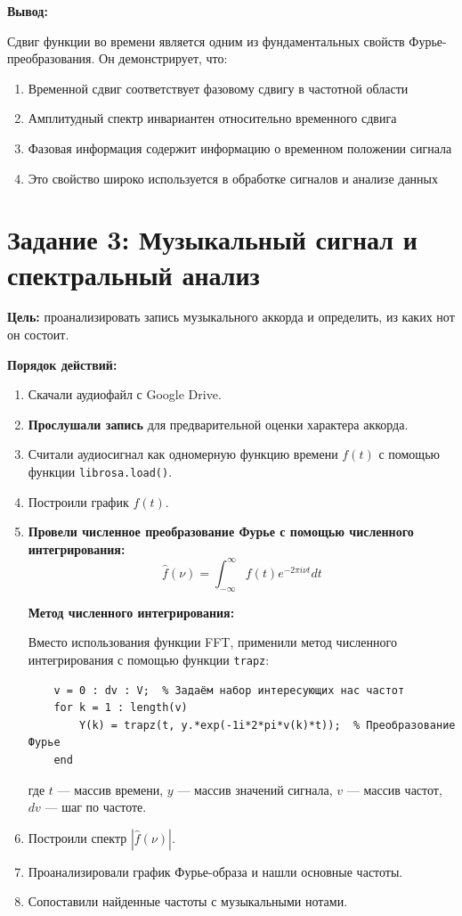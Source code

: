 \textbf{Вывод:}

Сдвиг функции во времени является одним из фундаментальных свойств Фурье-преобразования. Он демонстрирует, что:

\begin{enumerate}
    \item Временной сдвиг соответствует фазовому сдвигу в частотной области
    \item Амплитудный спектр инвариантен относительно временного сдвига
    \item Фазовая информация содержит информацию о временном положении сигнала
    \item Это свойство широко используется в обработке сигналов и анализе данных
\end{enumerate}

\section*{Задание 3: Музыкальный сигнал и спектральный анализ}

\textbf{Цель:} проанализировать запись музыкального аккорда и определить, из каких нот он состоит.

\textbf{Порядок действий:}

\begin{enumerate}
    \item Скачали аудиофайл с Google Drive.
    \item \textbf{Прослушали запись} для предварительной оценки характера аккорда.
    \item Считали аудиосигнал как одномерную функцию времени $f(t)$ с помощью функции \texttt{librosa.load()}.
    \item Построили график $f(t)$.
    \item \textbf{Провели численное преобразование Фурье с помощью численного интегрирования:}
    \[
    \hat{f}(\nu) = \int_{-\infty}^{\infty} f(t) e^{-2\pi i \nu t} dt
    \]
    
    \textbf{Метод численного интегрирования:}
    
    Вместо использования функции FFT, применили метод численного интегрирования с помощью функции \texttt{trapz}:
    \begin{verbatim}
    v = 0 : dv : V;  % Задаём набор интересующих нас частот
    for k = 1 : length(v)
        Y(k) = trapz(t, y.*exp(-1i*2*pi*v(k)*t));  % Преобразование Фурье
    end
    \end{verbatim}
    
    где $t$ — массив времени, $y$ — массив значений сигнала, $v$ — массив частот, $dv$ — шаг по частоте.
    
    \item Построили спектр $|\hat{f}(\nu)|$.
    \item Проанализировали график Фурье-образа и нашли основные частоты.
    \item Сопоставили найденные частоты с музыкальными нотами.
\end{enumerate}

